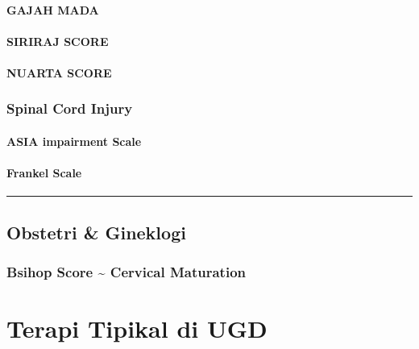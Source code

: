 \documentclass[
]{book}
\begin{document}
\hypertarget{gajah-mada}{%
\subsubsection{GAJAH MADA}\label{gajah-mada}}

\hypertarget{siriraj-score}{%
\subsubsection{SIRIRAJ SCORE}\label{siriraj-score}}

\hypertarget{nuarta-score}{%
\subsubsection{NUARTA SCORE}\label{nuarta-score}}

\hypertarget{spinal-cord-injury}{%
\subsection{Spinal Cord Injury}\label{spinal-cord-injury}}

\hypertarget{asia-impairment-scale}{%
\subsubsection{ASIA impairment Scale}\label{asia-impairment-scale}}

\hypertarget{frankel-scale}{%
\subsubsection{Frankel Scale}\label{frankel-scale}}

\begin{center}\rule{0.5\linewidth}{0.5pt}\end{center}

\hypertarget{obstetri-gineklogi}{%
\section{Obstetri \& Gineklogi}\label{obstetri-gineklogi}}

\hypertarget{bsihop-score-cervical-maturation}{%
\subsection{Bsihop Score \textasciitilde{} Cervical Maturation}\label{bsihop-score-cervical-maturation}}

\hypertarget{terapi-tipikal-di-ugd}{%
\chapter{Terapi Tipikal di UGD}\label{terapi-tipikal-di-ugd}}
\end{document}
